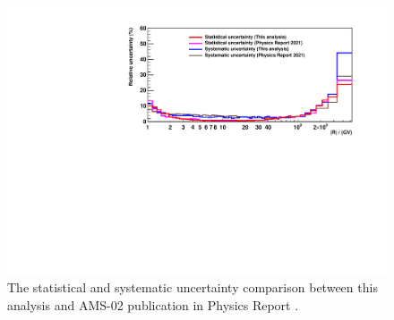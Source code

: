 \begin{figure}[hptb]
\centering
\includegraphics[width=1.0\textwidth, height=0.33\textheight]{Figures/chapter5/timeaveraged/StaSysRelErrCompare_pass78.pdf}
\caption[The statistical and systematic uncertainty comparison between this analysis and in Physics Report.]{The statistical and systematic uncertainty comparison between this analysis and AMS-02 publication in Physics Report \cite{PhysicsReport2}.}
\label{StaSysRelErrCompare}
\end{figure}
    
    
    
    
    